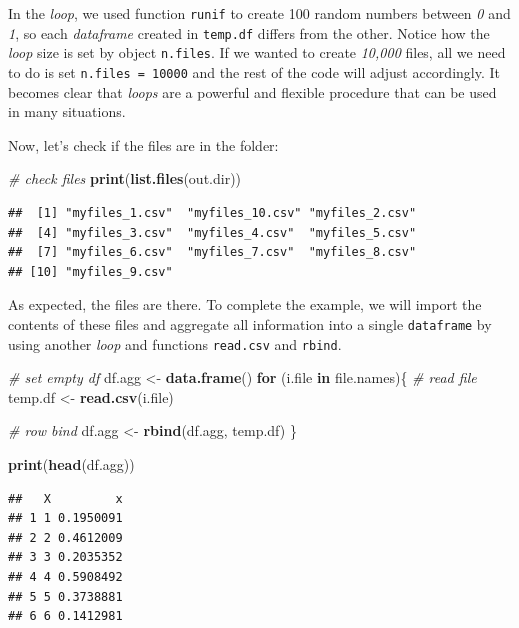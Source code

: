 \documentclass[11pt,]{book}
\newenvironment{Shaded}{\begin{snugshade}}{\end{snugshade}}
\newcommand{\KeywordTok}[1]{\textcolor[rgb]{0.27,0.27,0.27}{\textbf{#1}}}
\newcommand{\StringTok}[1]{\textcolor[rgb]{0.5,0.5,0.5}{#1}}
\newcommand{\CommentTok}[1]{\textcolor[rgb]{0.56,0.35,0.01}{\textit{#1}}}
\newcommand{\ControlFlowTok}[1]{\textcolor[rgb]{0.13,0.29,0.53}{\textbf{#1}}}
\newcommand{\NormalTok}[1]{#1}
\begin{document}
In the \emph{loop}, we used function \texttt{runif} to create 100 random
numbers between \emph{0} and \emph{1}, so each \emph{dataframe} created
in \texttt{temp.df} differs from the other. Notice how the \emph{loop}
size is set by object \texttt{n.files}. If we wanted to create
\emph{10,000} files, all we need to do is set \texttt{n.files\ =\ 10000}
and the rest of the code will adjust accordingly. It becomes clear that
\emph{loops} are a powerful and flexible procedure that can be used in
many situations.

Now, let's check if the files are in the folder:

\begin{Shaded}
\begin{Highlighting}[]
\CommentTok{# check files}
\KeywordTok{print}\NormalTok{(}\KeywordTok{list.files}\NormalTok{(out.dir))}
\end{Highlighting}
\end{Shaded}

\begin{verbatim}
##  [1] "myfiles_1.csv"  "myfiles_10.csv" "myfiles_2.csv" 
##  [4] "myfiles_3.csv"  "myfiles_4.csv"  "myfiles_5.csv" 
##  [7] "myfiles_6.csv"  "myfiles_7.csv"  "myfiles_8.csv" 
## [10] "myfiles_9.csv"
\end{verbatim}

As expected, the files are there. To complete the example, we will
import the contents of these files and aggregate all information into a
single \texttt{dataframe} by using another \emph{loop} and functions
\texttt{read.csv} and \texttt{rbind}.

\begin{Shaded}
\begin{Highlighting}[]
\CommentTok{# set empty df}
\NormalTok{df.agg <-}\StringTok{ }\KeywordTok{data.frame}\NormalTok{()}
\ControlFlowTok{for}\NormalTok{ (i.file }\ControlFlowTok{in}\NormalTok{ file.names)\{}
  \CommentTok{# read file}
\NormalTok{  temp.df <-}\StringTok{ }\KeywordTok{read.csv}\NormalTok{(i.file)}
  
  \CommentTok{# row bind }
\NormalTok{  df.agg <-}\StringTok{ }\KeywordTok{rbind}\NormalTok{(df.agg, temp.df)}
\NormalTok{\}}

\KeywordTok{print}\NormalTok{(}\KeywordTok{head}\NormalTok{(df.agg))}
\end{Highlighting}
\end{Shaded}

\begin{verbatim}
##   X         x
## 1 1 0.1950091
## 2 2 0.4612009
## 3 3 0.2035352
## 4 4 0.5908492
## 5 5 0.3738881
## 6 6 0.1412981
\end{verbatim}
\end{document}
